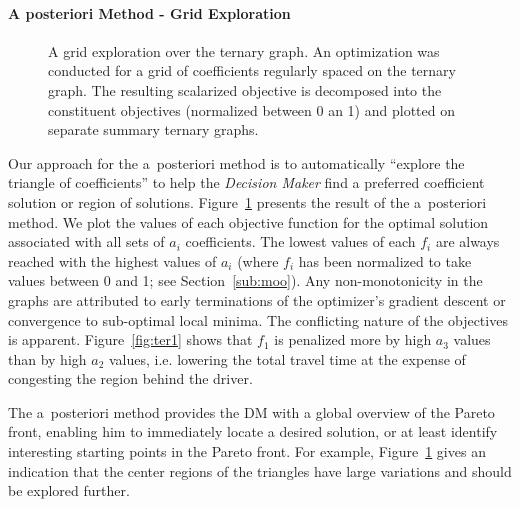 \paragraph{A posteriori Method - Grid Exploration}
\begin{figure}[t]
\centering
{}%
%
%
%

\caption[A grid exploration over the ternary graph. An optimization was conducted for a grid of coefficients regularly spaced on the ternary graph.]{A grid exploration over the ternary graph. An optimization was conducted for a grid of coefficients regularly spaced on the ternary graph. The resulting scalarized objective is decomposed into the constituent objectives (normalized between 0 an 1) and plotted on separate summary ternary graphs.}
\label{fig:triangles}
\end{figure}
Our approach for the a~posteriori method is to automatically ``explore the triangle of coefficients'' to help the \emph{Decision Maker} find a preferred coefficient solution or region of solutions. Figure~\ref{fig:triangles} presents the result of the a~posteriori method. We plot the values of each objective function for the optimal solution associated with all sets of $a_i$ coefficients. The lowest values of each $f_i$ are always reached with the highest values of $a_i$ (where $f_i$ has been normalized to take values between 0 and 1; see Section~\ref{sub:moo}). Any non-monotonicity in the graphs are attributed to early terminations of the optimizer's gradient descent or convergence to sub-optimal local minima. The conflicting nature of the objectives is apparent. Figure~\ref{fig:ter1} shows that $f_1$ is penalized more by high $a_3$ values than by high $a_2$ values, i.e. lowering the total travel time at the expense of congesting the region behind the driver.

The a~posteriori method provides the DM with a global overview of the Pareto front, enabling him to immediately locate a desired solution, or at least identify interesting starting points in the Pareto front. For example, Figure~\ref{fig:triangles} gives an indication that the center regions of the triangles have large variations and should be explored further.

